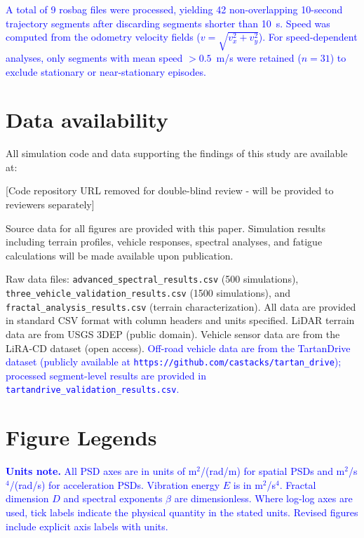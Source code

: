\documentclass[11pt]{article}
\begin{document}
\textcolor{blue}{A total of 9 rosbag files were processed, yielding 42 non-overlapping 10-second trajectory segments after discarding segments shorter than 10~s. Speed was computed from the odometry velocity fields ($v = \sqrt{v_x^2 + v_y^2}$). For speed-dependent analyses, only segments with mean speed $> 0.5$~m/s were retained ($n = 31$) to exclude stationary or near-stationary episodes.}


\section*{Data availability}

All simulation code and data supporting the findings of this study are available at:

\begin{center}
[Code repository URL removed for double-blind review - will be provided to reviewers separately]
\end{center}

Source data for all figures are provided with this paper. Simulation results including terrain profiles, vehicle responses, spectral analyses, and fatigue calculations will be made available upon publication. 

Raw data files: \texttt{advanced\_spectral\_results.csv} (500 simulations), \texttt{three\_\allowbreak vehicle\_\allowbreak validation\_\allowbreak results.csv} (1500 simulations), and \texttt{fractal\_\allowbreak analysis\_\allowbreak results.csv} (terrain characterization). All data are provided in standard CSV format with column headers and units specified. LiDAR terrain data are from USGS 3DEP (public domain). Vehicle sensor data are from the LiRA-CD dataset (open access). \textcolor{blue}{Off-road vehicle data are from the TartanDrive dataset\cite{Triest2022} (publicly available at \texttt{https://github.com/castacks/tartan\_drive}); processed segment-level results are provided in \texttt{tartandrive\_validation\_results.csv}.}




\section*{Figure Legends}

\textcolor{blue}{\textbf{Units note.} All PSD axes are in units of m$^2$/(rad/m) for spatial PSDs and m$^2$/s$^4$/(rad/s) for acceleration PSDs. Vibration energy $E$ is in m$^2$/s$^4$. Fractal dimension $D$ and spectral exponents $\beta$ are dimensionless. Where log-log axes are used, tick labels indicate the physical quantity in the stated units. Revised figures include explicit axis labels with units.}
\end{document}
